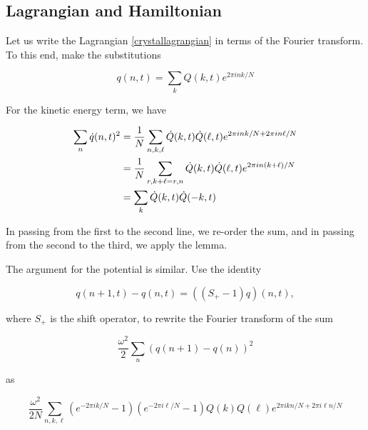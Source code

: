  \subsection{Lagrangian  and  Hamiltonian}

Let us write  the  Lagrangian   \eqref{crystallagrangian} in  terms  of  the  Fourier  transform.   To  this  end,  make  the  substitutions



\begin{equation}
q(n,t) = \sum_k Q(k,t) e^{2\pi i nk/N}
\end{equation}


For  the  kinetic  energy  term,
 we  have



\begin{align}
\sum_n \dot q(n,t)^2 &=
\small{\frac{1}{N}} \sum_{n,k , \ell} \dot Q(k,t) \dot Q(\ell,t)
e^{2\pi i nk/N + 2\pi i n\ell/N} \\
&= \small{\frac{1}{N}} \sum_{r , k+\ell = r,n} \dot Q(k,t) \dot Q(\ell,t)
e^{2\pi i n(k + \ell)/N } \\
&= \sum_{k} \dot Q(k,t) \dot Q(-k,t)
\end{align}


In  passing  from  the  first  to  the  second  line,  we  re-order  the  sum,  and  in  passing  from  the  second  to  the  third,  we  apply  the  lemma.



The  argument  for  the  potential  is  similar.   Use  the  identity



\begin{equation}
q(n+1,t) - q(n,t) = ((S_+ - 1)q)(n,t),
\end{equation}


where   $S_+$  is  the  shift  operator,  to  rewrite  the  Fourier  transform  of  the  sum



\begin{equation}
\frac{\omega^2}{2}\sum_n (q(n+1) - q(n))^2
\end{equation}


as



\begin{equation}
\frac{\omega^2}{2N} \sum_{n,k,\ell}
(e^{-2\pi i k/N} - 1)
(e^{-2\pi i \ell/N} - 1)
Q(k) Q(\ell)  e^{2\pi i k n/N + 2\pi i \ell n/N}
\end{equation}


